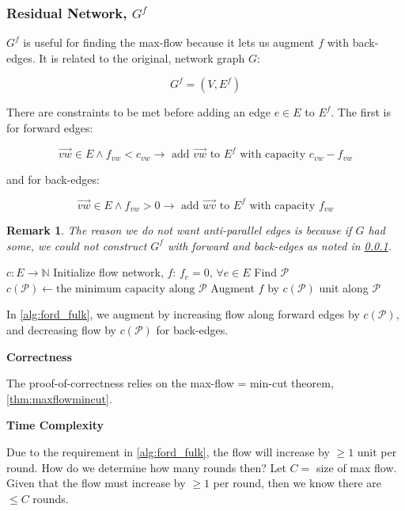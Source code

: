\documentclass{article}
\newtheorem{remark}{Remark}
\theoremstyle{definition}
\begin{document}
\subsubsection{Residual Network, $G^f$}
\label{residual_net}
$G^f$ is useful for finding the max-flow because it lets us augment $f$ with back-edges. It is related to the original, network graph $G$:

$$G^f = (V, E^f)$$

There are constraints to be met before adding an edge $e \in E$ to $E^f$. The first is for forward edges:

$$\overrightarrow{vw} \in E \land f_{vw} < c_{vw} \to \text{ add } \overrightarrow{vw} \text { to } E^f \text { with capacity } c_{vw} - f_{vw}$$

and for back-edges:

$$\overrightarrow{vw} \in E \land f_{vw} > 0 \to \text{ add } \overrightarrow{wv} \text { to } E^f \text { with capacity } f_{vw}$$

\begin{remark}
The reason we do not want anti-parallel edges is because if $G$ had some, we could not construct $G^f$ with forward and back-edges as noted in \ref{residual_net}.
\end{remark}

\begin{algorithm}[H]
\caption{$FordFulkerson$}
\label{alg:ford_fulk}
\begin{algorithmic}[1]
	\REQUIRE $c : E \to \mathbb{N}$ 
	\STATE Initialize flow network, $f$: $f_e = 0, \, \forall e \in E$
		\STATE Find $\mathcal{P}$
		\STATE $c(\mathcal{P}) \gets \text{the minimum capacity along } \mathcal{P}$
		\STATE Augment $f$ by $c(\mathcal{P})$ unit along $\mathcal{P}$
	\ENDWHILE
\end{algorithmic}
\end{algorithm}

In \ref{alg:ford_fulk}, we augment by increasing flow along forward edges by $c(\mathcal{P})$, and decreasing flow by $c(\mathcal{P})$ for back-edges. 

\textbf{Correctness}

The proof-of-correctness relies on the max-flow = min-cut theorem, \ref{thm:maxflowmincut}. 

\textbf{Time Complexity}

Due to the requirement in \ref{alg:ford_fulk}, the flow will increase by $\geq 1$ unit per round. How do we determine how many rounds then? Let $C=$ size of max flow. Given that the flow must increase by $\geq 1$ per round, then we know there are $\leq C$ rounds. 
\end{document}
